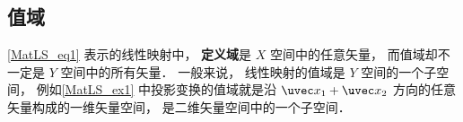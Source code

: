 \subsection{值域}
\autoref{MatLS_eq1} 表示的线性映射中， \textbf{定义域}是 $X$ 空间中的任意矢量， 而值域却不一定是 $Y$ 空间中的所有矢量． 一般来说， 线性映射的值域是 $Y$ 空间的一个子空间， 例如\autoref{MatLS_ex1} 中投影变换的值域就是沿 $\uvec x_1 + \uvec x_2$ 方向的任意矢量构成的一维矢量空间， 是二维矢量空间中的一个子空间．


